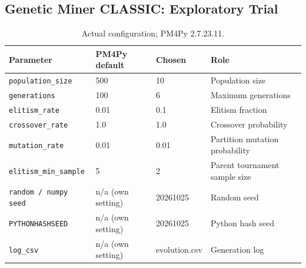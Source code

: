 \subsection{Genetic Miner CLASSIC: Exploratory Trial}
\begin{table}[h!]
\centering
\small
\begin{tabular}{p{}p{}p{}p{}}
\hline
Parameter & PM4Py default & Chosen & Role \\
\hline
\texttt{population\_\allowbreak{}size} & 500 & 10 & Population size \\
\texttt{generations} & 100 & 6 & Maximum generations \\
\texttt{elitism\_\allowbreak{}rate} & 0.01 & 0.1 & Elitism fraction \\
\texttt{crossover\_\allowbreak{}rate} & 1.0 & 1.0 & Crossover probability \\
\texttt{mutation\_\allowbreak{}rate} & 0.01 & 0.01 & Partition mutation probability \\
\texttt{elitism\_\allowbreak{}min\_\allowbreak{}sample} & 5 & 2 & Parent tournament sample size \\
\texttt{random / numpy seed} & n/a (own setting) & 20261025 & Random seed \\
\texttt{PYTHONHASHSEED} & n/a (own setting) & 20261025 & Python hash seed \\
\texttt{log\_\allowbreak{}csv} & n/a (own setting) & evolution.csv & Generation log \\
\hline
\end{tabular}
\caption{Actual configuration; PM4Py 2.7.23.11.}
\end{table}
